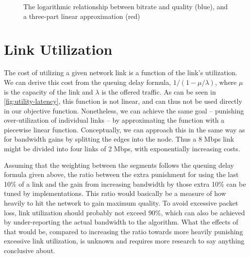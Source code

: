 \begin{figure}
    \centering


    \caption{The logarithmic relationship between bitrate and quality (blue), and a three-part linear approximation (red)}
    \label{fig:bitrate-quality}
\end{figure}

\section{Link Utilization}

The cost of utilizing a given network link is a function of the link's utilization. We can derive this cost from the queuing delay formula, $1/(1 - \mu/\lambda)$, where $\mu$ is the capacity of the link and $\lambda$ is the offered traffic. As can be seen in \autoref{fig:utility-latency}, this function is not linear, and can thus not be used directly in our objective function. Nonetheless, we can achieve the same goal -- punishing over-utilization of individual links -- by approximating the function with a piecewise linear function. Conceptually, we can approach this in the same way as for bandwidth gains by splitting the edges into the node. Thus a 8 Mbps link might be divided into four links of 2 Mbps, with exponentially increasing costs.

Assuming that the weighting between the segments follows the queuing delay formula given above, the ratio between the extra punishment for using the last 10\% of a link and the gain from increasing bandwidth by those extra 10\% can be tuned by implementations. This ratio would basically be a measure of how heavily to hit the network to gain maximum quality. To avoid excessive packet loss, link utilization should probably not exceed 90\%, which can also be achieved by under-reporting the actual bandwidth to the algorithm. What the effects of that would be, compared to increasing the ratio towards more heavily punishing excessive link utilization, is unknown and requires more research to say anything conclusive about.

